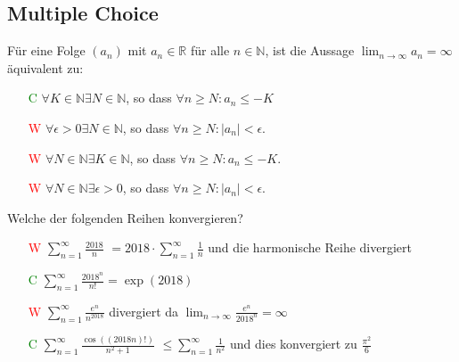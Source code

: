 \documentclass[7pt,landscape, margin = 0.1mm]{article}
\begin{document}
\begin{multicols}{4}
\begin{flushleft}
\begin{flushleft}
\subsection{Multiple Choice}
\vspace{1mm} \hline \vspace{3mm}
Für eine Folge $(a_n)$ mit $a_n \in \mathbb{R}$ für alle $n \in \mathbb{N}$, ist die Aussage $\lim_{n \to \infty } a_n = \infty$ äquivalent zu:
\begin{itemize}
\item[\textcolor{green}{C}]$\forall K \in \mathbb{N} \exists N \in \mathbb{N}$, so dass $\forall n \geq N: a_n \leq-K$
\item[\textcolor{red}{W}]$\forall \epsilon>0 \exists N \in \mathbb{N}$, so dass $\forall n \geq N:\left|a_n\right|<\epsilon$.
\item[\textcolor{red}{W}]$\forall N \in \mathbb{N} \exists K \in \mathbb{N}$, so dass $\forall n \geq N: a_n \leq-K$.
\item[\textcolor{red}{W}]$\forall N \in \mathbb{N} \exists \epsilon>0$, so dass $\forall n \geq N:\left|a_n\right|<\epsilon$.
\end{itemize} 
\vspace{1mm} \hline \vspace{1mm}
Welche der folgenden Reihen konvergieren?
\begin{itemize}
\item[\textcolor{red}{W}]$ \sum_{n=1}^{\infty} \frac{2018}{n} $ \textcolor{Emerald}{ $= 2018\cdot \sum_{n=1}^{\infty} \frac{1}{n}$ und die harmonische Reihe divergiert}
\item[\textcolor{green}{C}]$ \sum_{n=1}^{\infty} \frac{2018^n}{n !} $\textcolor{Emerald}{$= \exp(2018)$}
\item[\textcolor{red}{W}]$\sum_{n=1}^{\infty} \frac{e^n}{n^{2018}} $\textcolor{Emerald}{ divergiert da $\lim_{n \to \infty} \frac{e^n}{2018^n} = \infty$}
\item[\textcolor{green}{C}] $\sum_{n=1}^{\infty} \frac{\cos ((2018 n) !)}{n^2+1}$\textcolor{Emerald}{ $\leq  \sum_{n=1}^{\infty} \frac{1}{n^2}$ und dies konvergiert zu $\frac{\pi^2}{6}$}
\end{itemize}


\end{flushleft}
\end{flushleft}
\end{multicols}
\end{document}
